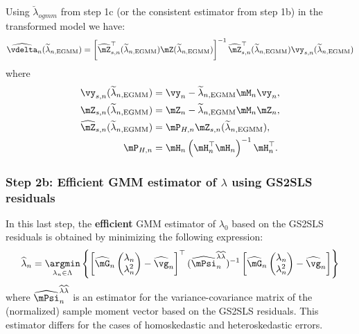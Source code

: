 \documentclass[english,12pt]{book}\usepackage[]{graphicx}\usepackage[]{xcolor}
\begin{document}
Using $\breve{\lambda}_{ogmm}$ from step 1c (or the consistent estimator from step 1b) in the transformed model we have:
\begin{equation*}
  \widehat{\vdelta}_n(\widetilde{\lambda}_{n, \textrm{EGMM}}) = \left[\widehat{\mZ}_{s,n}^\top(\widetilde{\lambda}_{n, \textrm{EGMM}}) \mZ(\widetilde{\lambda}_{n, \textrm{EGMM}})\right]^{-1}  \widehat{\mZ}_{s, n}^\top(\widetilde{\lambda}_{n, \textrm{EGMM}}) \vy_{s, n}(\widetilde{\lambda}_{n, \textrm{EGMM}})
\end{equation*}
%
where
\begin{equation*}
  \begin{aligned}
    \vy_{s, n}(\widetilde{\lambda}_{n, \textrm{EGMM}})           & = \vy_n - \widetilde{\lambda}_{n, \textrm{EGMM}}\mM_n\vy_n, \\
    \mZ_{s, n}(\widetilde{\lambda}_{n, \textrm{EGMM}})           & = \mZ_n - \widetilde{\lambda}_{n, \textrm{EGMM}}\mM_n\mZ_n, \\
    \widehat{\mZ}_{s, n}(\widetilde{\lambda}_{n, \textrm{EGMM}}) & = \mP_{H, n}\mZ_{s, n}(\widetilde{\lambda}_{n, \textrm{EGMM}}),\\
    \mP_{H, n}           & = \mH_n\left(\mH^\top_n\mH_n\right)^{-1}\mH^\top_n.
  \end{aligned}
\end{equation*}


\subsubsection{Step 2b: Efficient GMM estimator of $\lambda$ using GS2SLS  residuals}

In this last step, the \textbf{efficient} GMM estimator of $\lambda_0$ based on the GS2SLS residuals is obtained by minimizing the following expression:
\begin{equation*}
\widehat{\lambda}_n = \underset{\lambda_n \in \Lambda}{\argmin}\left\lbrace \left[\widehat{\mG}_n
\begin{pmatrix} \lambda_n \\
                \lambda^2_n
\end{pmatrix}
- \widehat{\vg}_n \right]^\top (\widehat{\mPsi}_n^{\widehat{\lambda}\widehat{\lambda}})^{-1} \left[\widehat{\mG}_n\begin{pmatrix} \lambda_n \\
                \lambda^2_n
\end{pmatrix} - \widehat{\vg}_n \right]\right\rbrace
\end{equation*}
%
where $\widehat{\mPsi}_n^{\widehat{\lambda}\widehat{\lambda}}$ is an estimator for the variance-covariance matrix of the (normalized) sample moment vector based on the GS2SLS residuals. This estimator differs for the cases of homoskedastic and heteroskedastic errors.
\end{document}
